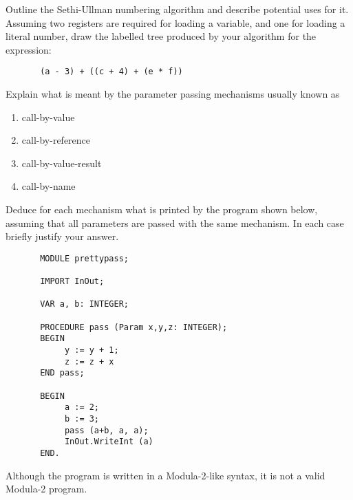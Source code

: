 \begin{subquestions}

\subquestion
Outline the Sethi-Ullman numbering algorithm and 
describe potential uses for it.  Assuming two registers
are required for loading a variable, and one for loading a literal number, 
draw the labelled
tree produced by your algorithm for the expression:
\begin{verbatim}
       (a - 3) + ((c + 4) + (e * f))
\end{verbatim}

\subquestion

        Explain what is meant by the parameter passing mechanisms usually
        known as
                \begin{enumerate}
                \item call-by-value
                \item call-by-reference
                \item call-by-value-result
                \item call-by-name
                \end{enumerate}
        Deduce for each mechanism what is printed by the 
        program shown below, assuming that all parameters are
	passed with the same mechanism.
        In each case briefly justify your answer.
\begin{verbatim}
       MODULE prettypass; 
       
       IMPORT InOut;

       VAR a, b: INTEGER;
 
       PROCEDURE pass (Param x,y,z: INTEGER);
       BEGIN
            y := y + 1;
            z := z + x
       END pass;
               
       BEGIN
            a := 2;
            b := 3;
            pass (a+b, a, a);
            InOut.WriteInt (a)
       END.
\end{verbatim}                   
Although the program is written in a Modula-2-like syntax, it
is not a valid Modula-2 program.

\end{subquestions}
